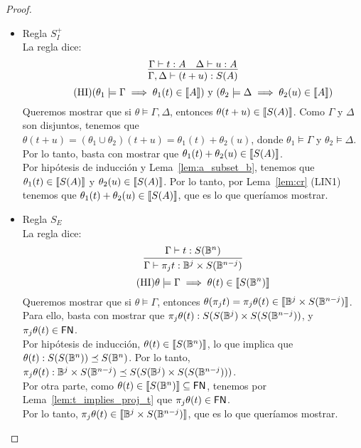 \begin{proof}
\begin{itemize}
    \item Regla \( S^{+}_{I} \)
    \\ La regla dice:
    \[ \infer{\Gamma, \Delta \vdash (t + u): S(A)}{\Gamma \vdash t : A & \Delta \vdash u : A} \]
    \[
      \tag{HI}
      (\theta_1 \models \Gamma \implies \theta_1(t) \in \llbracket A\rrbracket)
      \text{ y }
      (\theta_2 \models \Delta \implies \theta_2(u) \in \llbracket A\rrbracket)
    \]
    Queremos mostrar que si \( \theta \models \Gamma, \Delta \), entonces \( \theta(t + u) \in \llbracket S(A)\rrbracket \). Como \( \Gamma \) y \( \Delta \) son disjuntos, tenemos que \( \theta(t + u) = (\theta_1 \cup \theta_2)(t + u) = \theta_1(t) + \theta_2(u) \), donde \( \theta_1 \models \Gamma \) y \( \theta_2 \models \Delta \).
    Por lo tanto, basta con mostrar que \( \theta_1(t) + \theta_2(u) \in \llbracket S(A)\rrbracket \).
    \\ Por hipótesis de inducción y Lema~\ref{lem:a_subset_b}, tenemos que \( \theta_1(t) \in \llbracket S(A)\rrbracket \) y \( \theta_2(u) \in \llbracket S(A)\rrbracket \). Por lo tanto, por Lema~\ref{lem:cr} (LIN1) tenemos que \( \theta_1(t) + \theta_2(u) \in \llbracket S(A)\rrbracket \), que es lo que queríamos mostrar.

    \item Regla \( S_E \)
    \\ La regla dice:
    \[ \infer{\Gamma \vdash \proj{j}{t} : \qubittype^j \times S(\qubittype^{n - j})}{\Gamma \vdash t : S(\qubittype^n)} \]
    \[ \tag{HI} \theta \models \Gamma \implies \theta(t) \in \llbracket S(\mathbb{B}^n)\rrbracket \]
    Queremos mostrar que si \( \theta \models \Gamma \), entonces \( \theta(\pi_{j} t) = \pi_{j} \theta(t) \in \llbracket\mathbb{B}^j \times S(\mathbb{B}^{n - j})\rrbracket \). Para ello, basta con mostrar que \( \pi_{j} \theta(t) : S(S(\mathbb{B}^j) \times S(S(\mathbb{B}^{n - j})) \), y \( \pi_{j} \theta(t) \in \mathsf{FN} \).
    \\ Por hipótesis de inducción, \( \theta(t) \in \llbracket S(\mathbb{B}^n)\rrbracket \), lo que implica que \( \theta(t) : S(S(\mathbb{B}^n)) \preceq S(\mathbb{B}^n) \). Por lo tanto, \( \pi_{j} \theta(t) : \mathbb{B}^j \times S(\mathbb{B}^{n - j}) \preceq S(S(\mathbb{B}^j) \times S(S(\mathbb{B}^{n - j}))) \).
    \\ Por otra parte, como \( \theta(t) \in \llbracket S(\mathbb{B}^n)\rrbracket \subseteq \mathsf{FN} \), tenemos por Lema~\ref{lem:t_implies_proj_t} que \( \pi_{j} \theta(t) \in \mathsf{FN} \).
    \\ Por lo tanto, \( \pi_{j} \theta(t) \in \llbracket\mathbb{B}^j \times S(\mathbb{B}^{n - j})\rrbracket \), que es lo que queríamos mostrar.


\end{itemize}
\end{proof}
